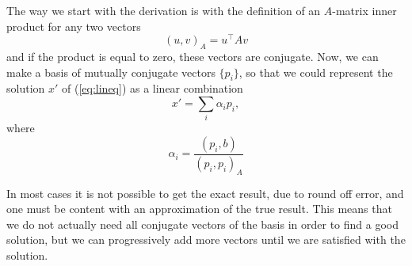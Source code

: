 The way we start with the derivation is with the definition of an $A$-matrix inner product for any two vectors
\begin{equation}
    \left( u, v \right)_A = u^\top A v
    \label{eq:cg_constraint}
\end{equation}
and if the product is equal to zero, these vectors are conjugate. Now, we can make a basis of mutually conjugate vectors $\{ p_i \}$, so that we could represent the solution $x'$ of (\ref{eq:lineq}) as a linear combination
\begin{equation}
    x' = \sum_i \alpha_i p_i,
\end{equation}
where
\begin{equation}
    \alpha_i = \frac{\left( p_i, b \right)}{\left( p_i, p_i \right)_A}
\end{equation}

In most cases it is not possible to get the exact result, due to round off error, and one must be content with an approximation of the true result. This means that we do not actually need all conjugate vectors of the basis in order to find a good solution, but we can progressively add more vectors until we are satisfied with the solution.

